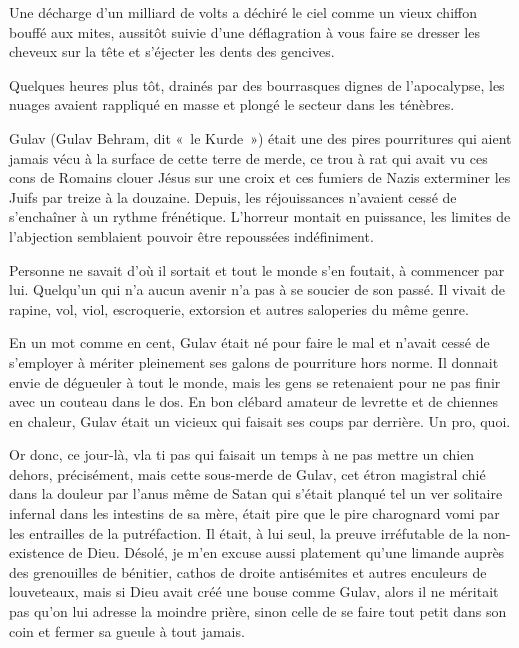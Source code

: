 Une décharge d’un milliard de volts a déchiré le ciel comme un vieux chiffon bouffé aux mites, aussitôt suivie d’une déflagration à vous faire se dresser les cheveux sur la tête et s’éjecter les dents des gencives.

Quelques heures plus tôt, drainés par des bourrasques dignes de l’apocalypse, les nuages avaient rappliqué en masse et plongé le secteur dans les ténèbres.

Gulav (Gulav Behram, dit «~le Kurde~») était une des pires pourritures qui aient jamais vécu à la surface de cette terre de merde, ce trou à rat qui avait vu ces cons de Romains clouer Jésus sur une croix et ces fumiers de Nazis exterminer les Juifs par treize à la douzaine. Depuis, les réjouissances n’avaient cessé de s’enchaîner à un rythme frénétique. L’horreur montait en puissance, les limites de l’abjection semblaient pouvoir être repoussées indéfiniment.

Personne ne savait d’où il sortait et tout le monde s’en foutait, à commencer par lui. Quelqu’un qui n’a aucun avenir n’a pas à se soucier de son passé. Il vivait de rapine, vol, viol, escroquerie, extorsion et autres saloperies du même genre.

En un mot comme en cent, Gulav était né pour faire le mal et n’avait cessé de s’employer à mériter pleinement ses galons de pourriture hors norme. Il donnait envie de dégueuler à tout le monde, mais les gens se retenaient pour ne pas finir avec un couteau dans le dos. En bon clébard amateur de levrette et de chiennes en chaleur, Gulav était un vicieux qui faisait ses coups par derrière. Un pro, quoi.

Or donc, ce jour-là, vla ti pas qui faisait un temps à ne pas mettre un chien dehors, précisément, mais cette sous-merde de Gulav, cet étron magistral chié dans la douleur par l’anus même de Satan qui s’était planqué tel un ver solitaire infernal dans les intestins de sa mère, était pire que le pire charognard vomi par les entrailles de la putréfaction. \label{rat:1}Il était, à lui seul, la preuve irréfutable de la non-existence de Dieu. Désolé, je m’en excuse aussi platement qu’une limande auprès des grenouilles de bénitier, cathos de droite antisémites et autres enculeurs de louveteaux, mais si Dieu avait créé une bouse comme Gulav, alors il ne méritait pas qu’on lui adresse la moindre prière, sinon celle de se faire tout petit dans son coin et fermer sa gueule à tout jamais.

